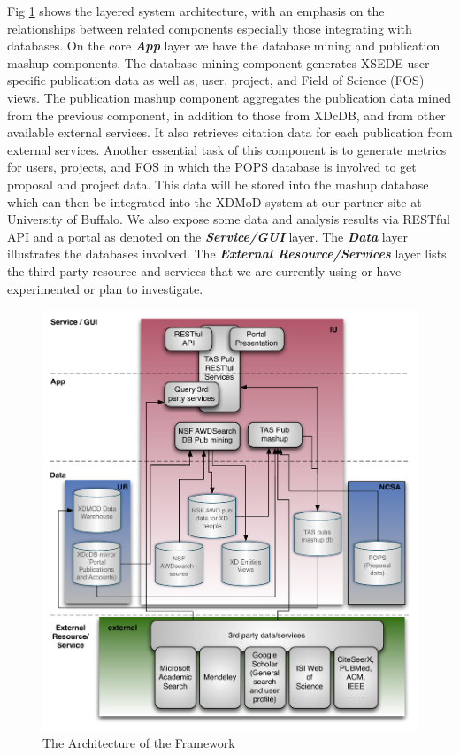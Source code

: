 \documentclass{sig-alternate}
\begin{document}
Fig \ref{F:tas-arch} shows the layered system architecture, with an emphasis on the relationships between related components especially those integrating with databases. On the core \emph{\textbf{App}} layer we have the database mining and publication mashup components. The database mining component generates XSEDE user specific publication data as well as, user, project, and Field of Science (FOS) views. The publication mashup component aggregates the publication data mined from the previous component, in addition to those from XDcDB, and from other available external services. It also retrieves citation data for each publication from external services. Another essential task of this component is to generate metrics for users, projects, and FOS in which the POPS database is involved to get proposal and project data. This data will be stored into the mashup database which can then be integrated into the XDMoD \cite{Furlani:2013:UXF:2484762.2484763} system at our partner site at University of Buffalo. We also expose some data and analysis results via RESTful API and a portal as denoted on the \emph{\textbf{Service/GUI}} layer. The \emph{\textbf{Data}} layer illustrates the databases involved. The \emph{\textbf{External Resource/Services}} layer lists the third party resource and services that we are currently using or have experimented or plan to investigate.

\begin{figure}[htb] 
  \centering 
    \includegraphics[width=1.0\columnwidth]{images/tas-arch.pdf} 
  \caption{The Architecture of the Framework}\label{F:tas-arch} 
\end{figure} 
\end{document}
